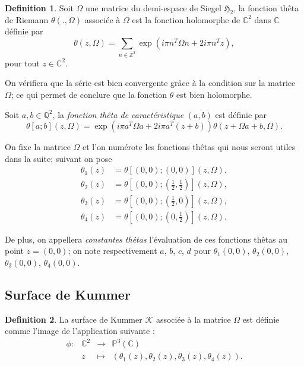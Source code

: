 \documentclass[a4paper,12pt]{article}
\theoremstyle{definition}
\newtheorem{definition}{Definition}[section]
\theoremstyle{remark}
\numberwithin{equation}{section}
\begin{document}
\begin{definition}
Soit $\Omega$ une matrice du demi-espace de Siegel $\mathfrak{H}_2$, la fonction thêta de Riemann $\theta(.,\Omega)$ associée à $\Omega$ est la fonction holomorphe de $\mathbb{C}^2$ dans $\mathbb{C}$ définie par
$$\theta(z,\Omega) = \sum_{n \in \mathbb{Z}^2}{\exp(i\pi n^T \Omega n + 2i\pi n^T z)},$$
pour tout $z \in \mathbb{C}^2$.

On vérifiera que la série est bien convergente grâce à la condition sur la matrice $\Omega$; ce qui permet de conclure que la fonction $\theta$ est bien holomorphe.

Soit $a,b \in \mathbb{Q}^2$, la \emph{fonction thêta de caractéristique} $(a,b)$ est définie par
$$\theta[a;b](z,\Omega) = \exp(i\pi a^T\Omega a + 2i\pi a^T(z+b))\theta(z + \Omega a + b, \Omega).$$
\end{definition}

On fixe la matrice $\Omega$ et l'on numérote les fonctions thêtas qui nous seront utiles dans la suite; suivant \citet{gaudry} on pose
\begin{align*}
\theta_1(z) &= \theta[(0,0);(0,0)](z,\Omega), \\
\theta_2(z) &= \theta[(0,0);(\frac{1}{2},\frac{1}{2})](z,\Omega), \\
\theta_3(z) &= \theta[(0,0);(\frac{1}{2},0)](z,\Omega), \\
\theta_4(z) &= \theta[(0,0);(0,\frac{1}{2})](z,\Omega).
\end{align*}

De plus, on appellera \emph{constantes thêtas} l'évaluation de ces fonctions thêtas au point $z=(0,0)$; on note respectivement $a$, $b$, $c$, $d$ pour $\theta_1(0,0)$, $\theta_2(0,0)$, $\theta_3(0,0)$, $\theta_4(0,0)$.

\subsection{Surface de Kummer}

\begin{definition}
La surface de Kummer $\mathcal{K}$ associée à la matrice $\Omega$ est définie comme l'image de l'application suivante :
\begin{equation*}
\begin{array}{lrcl}
\phi :&\mathbb{C}^2 & \longrightarrow & \mathbb{P}^3(\mathbb{C}) \\
& z & \longmapsto & (\theta_1(z),\theta_2(z),\theta_3(z),\theta_4(z)).
\end{array}
\end{equation*}
\end{definition}
\end{document}
